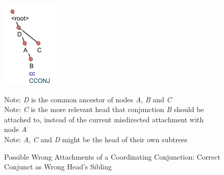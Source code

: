 \begin{figure}[H]
    \centering
    \includegraphics{img/nested1.png}
    \caption{Possible Wrong Attachments of a Coordinating Conjunction: Correct Conjunct as Wrong Head's Sibling}
    \begin{flushleft}
    Note: \textit{D} is the common ancestor of nodes \textit{A}, \textit{B} and \textit{C}\\
    Note: \textit{C} is the more relevant head that conjunction \textit{B} should be attached to, instead of the current misdirected attachment with node \textit{A}\\
    Note: \textit{A}, \textit{C} and \textit{D} might be the head of their own subtrees
    \end{flushleft}
    \label{fig:conj-head1}
\end{figure}

